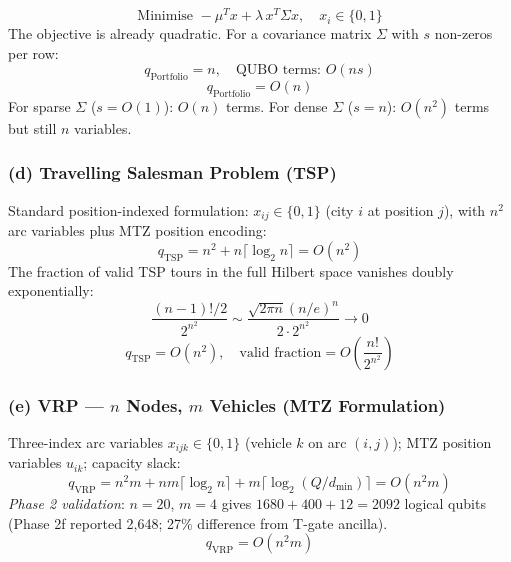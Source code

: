 \documentclass[11pt]{article}
\theoremstyle{remark}
\begin{document}
\begin{equation}
  \text{Minimise } -\mu^T x + \lambda\, x^T \Sigma x, \quad x_i \in \{0,1\}
\end{equation}
The objective is already quadratic. For a covariance matrix $\Sigma$ with
$s$ non-zeros per row:
\begin{equation}
  q_{\text{Portfolio}} = n, \quad \text{QUBO terms: } O(ns)
\end{equation}
\begin{equation}
  \boxed{q_{\text{Portfolio}} = O(n)}
\end{equation}
For sparse $\Sigma$ ($s = O(1)$): $O(n)$ terms.
For dense $\Sigma$ ($s = n$): $O(n^2)$ terms but still $n$ variables.

\subsubsection*{(d) Travelling Salesman Problem (TSP)}

Standard position-indexed formulation: $x_{ij} \in \{0,1\}$ (city $i$ at
position $j$), with $n^2$ arc variables plus MTZ position encoding:
\begin{equation}
  q_{\text{TSP}} = n^2 + n \lceil \log_2 n \rceil = O(n^2)
\end{equation}
The fraction of valid TSP tours in the full Hilbert space vanishes doubly
exponentially:
\begin{equation}
  \frac{(n-1)!/2}{2^{n^2}}
  \sim \frac{\sqrt{2\pi n}(n/e)^n}{2 \cdot 2^{n^2}} \to 0
\end{equation}
\begin{equation}
  \boxed{q_{\text{TSP}} = O(n^2), \quad
         \text{valid fraction} = O\!\left(\frac{n!}{2^{n^2}}\right)}
\end{equation}

\subsubsection*{(e) VRP --- $n$ Nodes, $m$ Vehicles (MTZ Formulation)}

Three-index arc variables $x_{ijk} \in \{0,1\}$ (vehicle $k$ on arc
$(i,j)$); MTZ position variables $u_{ik}$; capacity slack:
\begin{equation}
  q_{\text{VRP}} = n^2 m + nm\lceil\log_2 n\rceil
                 + m\lceil\log_2(Q/d_{\min})\rceil = O(n^2 m)
\end{equation}
\emph{Phase 2 validation}: $n=20$, $m=4$ gives
$1680 + 400 + 12 = 2092$ logical qubits (Phase 2f reported 2,648;
27\% difference from T-gate ancilla).
\begin{equation}
  \boxed{q_{\text{VRP}} = O(n^2 m)}
\end{equation}
\end{document}
